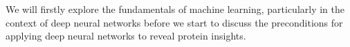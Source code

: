 We will firstly explore the fundamentals of machine learning, particularly in the context of deep neural networks before we start to discuss the preconditions for applying deep neural networks to reveal protein insights. 
\par 
